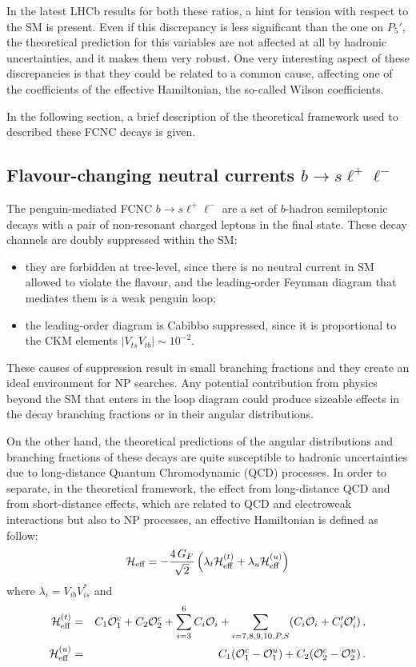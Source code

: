 In the latest LHCb results for both these ratios, a hint for tension with respect to the SM is present.
Even if this discrepancy is less significant than the one on $P_5'$, the theoretical prediction for this variables are not affected at all by hadronic uncertainties, and it makes them very robust.
One very interesting aspect of these discrepancies is that they could be related to a common cause, affecting one of the coefficients of the effective Hamiltonian, the so-called Wilson coefficients.

In the following section, a brief description of the theoretical framework used to described these FCNC decays is given.

\subsection[Flavour-changing neutral currents b to s l l]{Flavour-changing neutral currents $b\to s\ell^+\ell^-$}
\label{sec:FCNC}

The penguin-mediated FCNC $b\to s\ell^+\ell^-$ are a set of $b$-hadron semileptonic decays with a pair of non-resonant charged leptons in the final state.
These decay channels are doubly suppressed within the SM:
\begin{itemize}
\item they are forbidden at tree-level, since there is no neutral current in SM allowed to violate the flavour, and the leading-order Feynman diagram that mediates them is a weak penguin loop;
\item the leading-order diagram is Cabibbo suppressed, since it is proportional to the CKM elements $|V_{ts}V_{tb}|\sim10^{-2}$.
\end{itemize}
These causes of suppression result in small branching fractions and they create an ideal environment for NP searches.
Any potential contribution from physics beyond the SM that enters in the loop diagram could produce sizeable effects in the decay branching fractions or in their angular distributions.

On the other hand, the theoretical predictions of the angular distributions and branching fractions of these decays are quite susceptible to hadronic uncertainties due to long-distance Quantum Chromodynamic (QCD) processes.
In order to separate, in the theoretical framework, the effect from long-distance QCD and from short-distance effects, which are related to QCD and electroweak interactions but also to NP processes, an effective Hamiltonian is defined as follow:
\begin{equation} \label{eq:Heff}
  {\cal H}_{\textrm{eff}} = - \frac{4\,G_F}{\sqrt{2}}\left(\lambda_t {\cal H}_{\textrm{eff}}^{(t)} + \lambda_u {\cal H}_{\textrm{eff}}^{(u)}\right)
\end{equation}
where $\lambda_i=V_{ib}V_{is}^*$ and
\begin{eqnarray*}
  {\cal H}_{\textrm{eff}}^{(t)} & = & C_1 \mathcal O_1^c + C_2 \mathcal O_2^c + \sum_{i=3}^{6} C_i \mathcal O_i + \sum_{i=7,8,9,10,P,S} (C_i \mathcal O_i + C'_i \mathcal O'_i)\,, \\
  {\cal H}_{\textrm{eff}}^{(u)} & = & C_1 (\mathcal O_1^c-\mathcal O_1^u)  + C_2(\mathcal O_2^c-\mathcal O_2^u)\,.
\end{eqnarray*}

